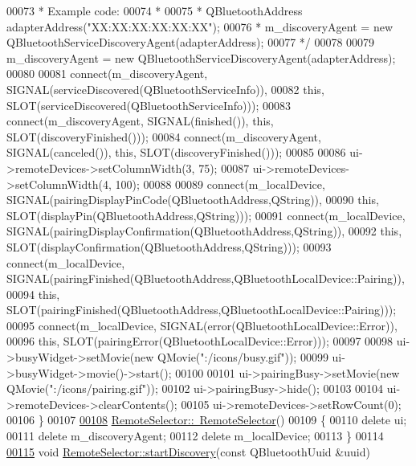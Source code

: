 \begin{DoxyCode}
00073 \textcolor{comment}{     * Example code:}
00074 \textcolor{comment}{     *}
00075 \textcolor{comment}{     * QBluetoothAddress adapterAddress("XX:XX:XX:XX:XX:XX");}
00076 \textcolor{comment}{     * m\_discoveryAgent = new QBluetoothServiceDiscoveryAgent(adapterAddress);}
00077 \textcolor{comment}{     */}
00078 
00079     m\_discoveryAgent = \textcolor{keyword}{new} QBluetoothServiceDiscoveryAgent(adapterAddress);
00080 
00081     connect(m\_discoveryAgent, SIGNAL(serviceDiscovered(QBluetoothServiceInfo)),
00082             \textcolor{keyword}{this}, SLOT(serviceDiscovered(QBluetoothServiceInfo)));
00083     connect(m\_discoveryAgent, SIGNAL(finished()), \textcolor{keyword}{this}, SLOT(discoveryFinished()));
00084     connect(m\_discoveryAgent, SIGNAL(canceled()), \textcolor{keyword}{this}, SLOT(discoveryFinished()));
00085 
00086     ui->remoteDevices->setColumnWidth(3, 75);
00087     ui->remoteDevices->setColumnWidth(4, 100);
00088 
00089     connect(m\_localDevice, SIGNAL(pairingDisplayPinCode(QBluetoothAddress,QString)),
00090             \textcolor{keyword}{this}, SLOT(displayPin(QBluetoothAddress,QString)));
00091     connect(m\_localDevice, SIGNAL(pairingDisplayConfirmation(QBluetoothAddress,QString)),
00092             \textcolor{keyword}{this}, SLOT(displayConfirmation(QBluetoothAddress,QString)));
00093     connect(m\_localDevice, SIGNAL(pairingFinished(QBluetoothAddress,QBluetoothLocalDevice::Pairing)),
00094             \textcolor{keyword}{this}, SLOT(pairingFinished(QBluetoothAddress,QBluetoothLocalDevice::Pairing)));
00095     connect(m\_localDevice, SIGNAL(error(QBluetoothLocalDevice::Error)),
00096             \textcolor{keyword}{this}, SLOT(pairingError(QBluetoothLocalDevice::Error)));
00097 
00098     ui->busyWidget->setMovie(\textcolor{keyword}{new} QMovie(\textcolor{stringliteral}{":/icons/busy.gif"}));
00099     ui->busyWidget->movie()->start();
00100 
00101     ui->pairingBusy->setMovie(\textcolor{keyword}{new} QMovie(\textcolor{stringliteral}{":/icons/pairing.gif"}));
00102     ui->pairingBusy->hide();
00103 
00104     ui->remoteDevices->clearContents();
00105     ui->remoteDevices->setRowCount(0);
00106 \}
00107 
\hypertarget{remoteselector_8cpp_source.tex_l00108}{}\hyperlink{classRemoteSelector_afa7b3a154952183e183d06c0a01f9c84}{00108} \hyperlink{classRemoteSelector_afa7b3a154952183e183d06c0a01f9c84}{RemoteSelector::~RemoteSelector}()
00109 \{
00110     \textcolor{keyword}{delete} ui;
00111     \textcolor{keyword}{delete} m\_discoveryAgent;
00112     \textcolor{keyword}{delete} m\_localDevice;
00113 \}
00114 
\hypertarget{remoteselector_8cpp_source.tex_l00115}{}\hyperlink{classRemoteSelector_aae9c338f7593d9b25d540d48da452111}{00115} \textcolor{keywordtype}{void} \hyperlink{classRemoteSelector_a63cf76514fa5b2bf1b85b87db1a49e99}{RemoteSelector::startDiscovery}(\textcolor{keyword}{const} QBluetoothUuid &uuid)

\end{DoxyCode}
